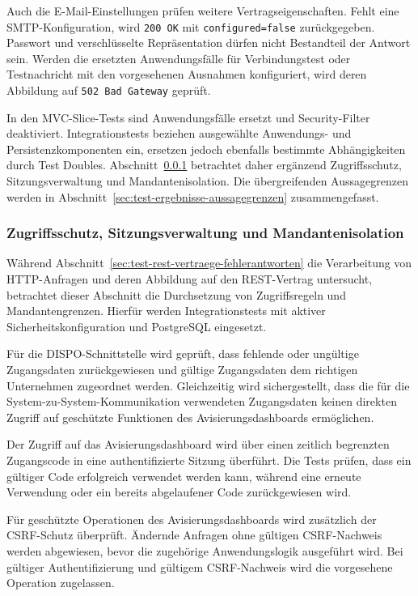 Auch die E-Mail-Einstellungen prüfen weitere Vertragseigenschaften. Fehlt eine
SMTP-Konfiguration, wird \texttt{200 OK} mit \texttt{configured=false}
zurückgegeben. Passwort und verschlüsselte Repräsentation dürfen nicht
Bestandteil der Antwort sein. Werden die ersetzten Anwendungsfälle für
Verbindungstest oder Testnachricht mit den vorgesehenen Ausnahmen konfiguriert,
wird deren Abbildung auf \texttt{502 Bad Gateway} geprüft.

In den MVC-Slice-Tests sind Anwendungsfälle ersetzt und Security-Filter
deaktiviert. Integrationstests beziehen ausgewählte Anwendungs- und
Persistenzkomponenten ein, ersetzen jedoch ebenfalls bestimmte Abhängigkeiten
durch Test Doubles. Abschnitt~\ref{sec:test-zugriffsschutz-mandantenisolation}
betrachtet daher ergänzend Zugriffsschutz, Sitzungsverwaltung und
Mandantenisolation. Die übergreifenden Aussagegrenzen werden in
Abschnitt~\ref{sec:test-ergebnisse-aussagegrenzen} zusammengefasst.

\subsubsection{Zugriffsschutz, Sitzungsverwaltung und Mandantenisolation}
\label{sec:test-zugriffsschutz-mandantenisolation}

Während Abschnitt~\ref{sec:test-rest-vertraege-fehlerantworten} die Verarbeitung
von HTTP-Anfragen und deren Abbildung auf den REST-Vertrag untersucht,
betrachtet dieser Abschnitt die Durchsetzung von Zugriffsregeln und
Mandantengrenzen. Hierfür werden Integrationstests mit aktiver
Sicherheitskonfiguration und PostgreSQL eingesetzt.

Für die DISPO-Schnittstelle wird geprüft, dass fehlende oder ungültige
Zugangsdaten zurückgewiesen und gültige Zugangsdaten dem richtigen Unternehmen
zugeordnet werden. Gleichzeitig wird sichergestellt, dass die für die
System-zu-System-Kommunikation verwendeten Zugangsdaten keinen direkten Zugriff
auf geschützte Funktionen des Avisierungsdashboards ermöglichen.

Der Zugriff auf das Avisierungsdashboard wird über einen zeitlich begrenzten
Zugangscode in eine authentifizierte Sitzung überführt. Die Tests prüfen, dass
ein gültiger Code erfolgreich verwendet werden kann, während eine erneute
Verwendung oder ein bereits abgelaufener Code zurückgewiesen wird.

Für geschützte Operationen des Avisierungsdashboards wird zusätzlich der
CSRF-Schutz überprüft. Ändernde Anfragen ohne gültigen CSRF-Nachweis werden
abgewiesen, bevor die zugehörige Anwendungslogik ausgeführt wird. Bei gültiger
Authentifizierung und gültigem CSRF-Nachweis wird die vorgesehene Operation
zugelassen.

